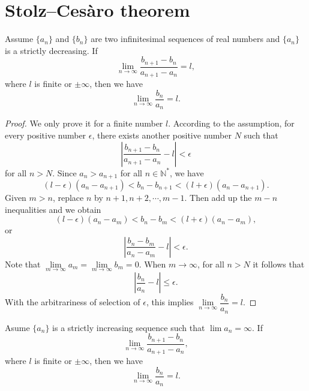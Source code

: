 \documentclass[11pt,fleqn]{book} %
\begin{document}
\section{Stolz–Cesàro theorem}

\begin{theorem}
	Assume $\{a_n\}$ and $\{b_n\}$ are two infinitesimal sequences of real numbers and $\{a_n\}$ is a strictly decreasing. If
	\[
		\lim\limits_{n\to\infty}\frac{b_{n+1}-b_n}{a_{n+1}-a_n}=l,
	\]
    where $l$ is finite or $\pm\infty$, then we have
	\[
	    \lim\limits_{n\to\infty}\frac{b_n}{a_n}=l.
	\]
\end{theorem}

\begin{proof}
	We only prove it for a finite number $l$. According to the assumption, for every positive number $\epsilon$, there exists another positive number $N$ such that
	\[
	\left|\frac{b_{n+1}-b_n}{a_{n+1}-a_n}-l\right|<\epsilon
	\]
	for all $n>N$. Since $a_n>a_{n+1}$ for all $n\in\mathbb{N^*}$, we have
	\[
	(l-\epsilon)(a_n-a_{n+1})<b_n-b_{n+1}<(l+\epsilon)(a_n-a_{n+1}).
	\]
	Given $m>n$, replace $n$ by $n+1,n+2,\cdots,m-1$. Then add up the $m-n$ inequalities and we obtain
	\[
	(l-\epsilon)(a_n-a_m)<b_n-b_m<(l+\epsilon)(a_n-a_m),
	\]
	or
	\[
	\left|\frac{b_n-b_m}{a_n-a_m}-l\right|<\epsilon.
	\]
	Note that $\lim\limits_{m\to\infty}a_m=\lim\limits_{m\to\infty}b_m=0$. When $m\to\infty$, for all $n>N$ it follows that
	\[
	\left|\frac{b_n}{a_n}-l\right|\leqslant\epsilon.
	\]
	With the arbitrariness of selection of $\epsilon$, this implies $\lim\limits_{n\to\infty}\dfrac{b_n}{a_n}=l$.
\end{proof}

\begin{theorem}
	Asume $\{a_n\}$ is a strictly increasing sequence such that $\lim a_n = \infty$. If
	\[
	\lim\limits_{n\to\infty}\frac{b_{n+1}-b_n}{a_{n+1}-a_n},
	\]
	where $l$ is finite or $\pm\infty$, then we have
	\[
	\lim\limits_{n\to\infty}\frac{b_n}{a_n}=l.
	\]
\end{theorem}
\end{document}
